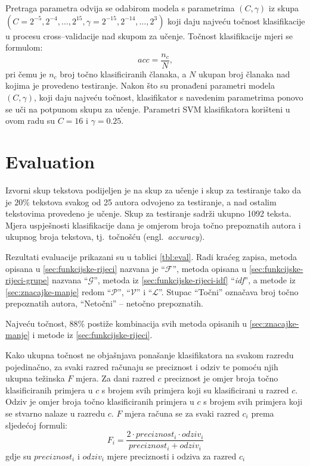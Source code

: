 \documentclass[11pt,english]{article}
\newcommand{\engl}[1]{(engl.~\emph{#1})}
\begin{document}
\begin{multicols}{2}
Pretraga parametra odvija se odabirom modela s parametrima $(C, \gamma)$ iz skupa
$\left (C = {2^{-5}, 2^{-4}, \ldots , 2^{15}},  \gamma = {2^{-15}, 2^{-14},
\ldots, 2^3} \right )$ \citep{CC01a} koji daju najveću točnost klasifikacije u
procesu cross--validacije nad skupom za učenje. Točnost klasifikacije mjeri se formulom:
\begin{equation}
acc = \frac{n_c}{N},
\end{equation}
pri čemu je $n_c$ broj točno klasificiranih članaka, a $N$ ukupan broj članaka
nad kojima je provedeno testiranje. Nakon što su pronađeni parametri modela $(C,
\gamma)$, koji daju najveću točnost, klasifikator s navedenim parametrima ponovo
se uči na potpunom skupu za učenje. Parametri SVM klasifikatora korišteni u ovom
radu su $C = 16$ i $\gamma = 0.25$.

\section{Evaluation}
\label{sec:evaluacija}
Izvorni skup tekstova podijeljen je na skup za učenje i skup za testiranje
tako da je $20\%$ tekstova svakog od 25 autora odvojeno za testiranje, a nad
ostalim tekstovima provedeno je učenje. Skup za testiranje sadrži
ukupno 1092 teksta. Mjera uspješnosti klasifikacije dana je omjerom broja točno
prepoznatih autora i ukupnog broja tekstova, tj.\ točnošću \engl{accuracy}.

Rezultati evaluacije prikazani su u tablici \ref{tbl:eval}. Radi kraćeg zapisa,
metoda opisana u \ref{sec:funkcijske-rijeci} nazvana je ``$\mathcal{F}$'', metoda
opisana u \ref{sec:funkcijske-rijeci-grupe} nazvana ``$\mathcal{G}$'',
metoda iz \ref{sec:funkcijske-rijeci-idf} ``\emph{idf}'', a metode iz
\ref{sec:znacajke-manje} redom ``$\mathcal{P}$'', ``$\mathcal{V}$'' i
``$\mathcal{L}$''. Stupac ``Točni'' označava broj točno prepoznatih autora,
``Netočni'' -- netočno prepoznatih.

Najveću točnost, 88\% postiže kombinacija svih metoda opisanih u
\ref{sec:znacajke-manje} i metode iz \ref{sec:funkcijske-rijeci}.

Kako ukupna točnost ne objašnjava ponašanje klasifikatora na svakom razredu
pojedinačno, za svaki razred računaju se preciznost i odziv te pomoću njih
ukupna težinska $F$ mjera. Za dani razred $c$ preciznost je omjer broja točno
klasificiranih primjera u $c$ s brojem svih primjera koji su klasificirani u
razred $c$. Odziv je omjer broja točno klasificiranih primjera u $c$ s brojem
svih primjera koji se stvarno nalaze u razredu $c$. $F$ mjera računa se za svaki
razred $c_i$ prema sljedećoj formuli:
\begin{equation}
F_i = \frac{2 \cdot preciznost_i \cdot odziv_i}{preciznost_i + odziv_i}
\end{equation}
gdje su $preciznost_i$ i $odziv_i$ mjere preciznosti i odziva za razred $c_i$


\end{multicols}
\end{document}
